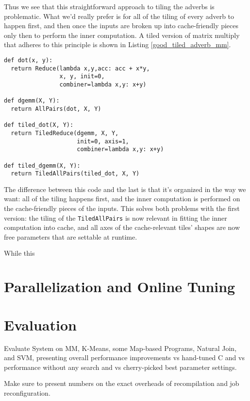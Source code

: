 \documentclass[preprint,9pt]{sigplanconf}
\begin{document}
Thus we see that this straightforward approach to tiling the adverbs is problematic.  What we'd really prefer is for all of the tiling of every adverb to happen first, and then once the inputs are broken up into cache-friendly pieces only then to perform the inner computation.  A tiled version of matrix multiply that adheres to this principle is shown in Listing \ref{good_tiled_adverb_mm}.

\begin{lstlisting}[label=good_tiled_adverb_mm, caption={Good Tiled Matrix Multiply}, belowskip=0.5em]
def dot(x, y):
  return Reduce(lambda x,y,acc: acc + x*y,
                x, y, init=0,
                combiner=lambda x,y: x+y)

def dgemm(X, Y):
  return AllPairs(dot, X, Y)

def tiled_dot(X, Y):
  return TiledReduce(dgemm, X, Y,
                     init=0, axis=1,
                     combiner=lambda x,y: x+y)
                     
def tiled_dgemm(X, Y):
  return TiledAllPairs(tiled_dot, X, Y)
\end{lstlisting}

The difference between this code and the last is that it's organized in the way we want: all of the tiling happens first, and the inner computation is performed on the cache-friendly pieces of the inputs. This solves both problems with the first version: the tiling of the \lstinline{TiledAllPairs} is now relevant in fitting the inner computation into cache, and all axes of the cache-relevant tiles' shapes are now free parameters that are settable at runtime.

While this 

\section{Parallelization and Online Tuning}
\label{online_tuning}

\section{Evaluation}
\label{evaluation}
Evaluate System on MM, K-Means, some Map-based Programs, Natural Join, and SVM, presenting overall performance improvements vs hand-tuned C and vs performance without any search and vs cherry-picked best parameter settings.

Make sure to present numbers on the exact overheads of recompilation and job reconfiguration.
\end{document}
